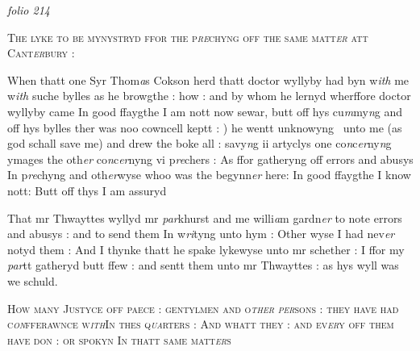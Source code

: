 \documentclass[12pt, a4paper]{book}
\begin{document}
\dotfill
						\newpage
{}

\textit{folio 214}



				\begin{center} \begin{large} {\scshape The lyke to be mynystryd ffor the p\textit{re}chyng 
off the same matt\textit{er} att Cant\textit{er}bury :} \end{large} \end{center}
			

		\ifthenelse{\isodd{\thepage}}
		{\reversemarginpar}
		{\normalmarginpar}
		When thatt one Syr Thom\textit{a}s Cokson herd thatt doctor wyllyby
			 had byn w\textit{ith} me w\textit{ith} suche bylles as he
browgthe : how : and by whom he lernyd wherffore doctor wyllyby came 
In good ffaygthe I am nott now sewar, butt off hys cu\textit{m}my\textit{n}g and off
hys bylles ther was noo cowncell keptt : ) he wentt unknowyng 
unto me (as god schall save me) and drew the boke all : savy\textit{n}g ii
artyclys one co\textit{n}c\textit{er}ny\textit{n}g ymages the oth\textit{er} co\textit{n}c\textit{er}nyng vi p\textit{re}chers : As ffor gatheryng
off errors and abusys In p\textit{re}chyng and oth\textit{er}wyse whoo was the begynn\textit{er}
here: In good ffaygthe I know nott: Butt off thys I am assuryd

	
				\marginpar[\vspace{0.5cm}{\textcolor{Gray}{Mr Twaith}}]{}
			
	
		\ifthenelse{\isodd{\thepage}}
		{\reversemarginpar}
		{\normalmarginpar}
		That mr Thwayttes wyllyd mr \textit{par}khurst and me willi\textit{a}m gardn\textit{er}
 to 
note errors and abusys : and to send them In w\textit{ri}tyng unto hym :
Other wyse I had nev\textit{er} notyd them : And I thynke thatt he spake
lykewyse unto mr schether : I ffor my \textit{par}tt gatheryd butt ffew : and
sentt them unto mr Thwayttes : as hys wyll was we schuld.

	
				\begin{center} \begin{large} {\scshape How many Justyce off paece : gentylmen and
	o\textit{ther}
	\textit{per}sons : they have had c\textit{on}fferawnce w\textit{ith}In thes
	q\textit{ua}rters : And whatt they : and ev\textit{er}y off them
	have don : or spokyn In thatt same matt\textit{er}s} \end{large} \end{center}
			
\end{document}
